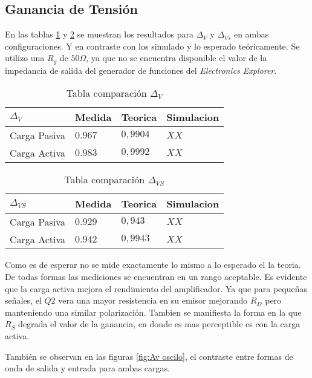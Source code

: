 \subsection{Ganancia de Tensión}

En las tablas \ref{table:comp av} y \ref{table:comp avs} se muestran los resultados para $\Delta_V$ y $\Delta_{Vs}$ en ambas configuraciones. Y en contraste con los simulado y lo esperado teóricamente.
Se utilizo una $R_g$ de $50\Omega$, ya que no se encuentra disponible el valor de la impedancia de salida del generador de funciones del \textit{Electronics Explorer}.

\begin{table}[ht]
    \centering
    \begin{tabular}{|l|l|l|l|}
    \hline
    $\Delta_V $  & Medida   & Teorica  & Simulacion \\ \hline
    Carga Pasiva & $0.967$  & $0,9904$ &  $XX$       \\ \hline
    Carga Activa & $0.983$  & $0,9992$ &  $XX$          \\ \hline
    \end{tabular}
    \caption{Tabla comparación $\Delta_V$}\label{table:comp av}
\end{table}

\begin{table}[ht]
    \centering
    \begin{tabular}{|l|l|l|l|}
    \hline
    $\Delta_{VS} $  & Medida   & Teorica  & Simulacion \\ \hline
    Carga Pasiva & $0.929$  & $0,943$ &  $XX$       \\ \hline
    Carga Activa & $0.942$  & $0,9943$ &  $XX$          \\ \hline
    \end{tabular}
    \caption{Tabla comparación $\Delta_{VS}$}\label{table:comp avs}
\end{table}

Como es de esperar no se mide exactamente lo mismo a lo esperado el la teoria. De todas formas las mediciones se encuentran en un rango aceptable. 
Es evidente que la carga activa mejora el rendimiento del amplificador. Ya que para pequeñas señales, el $Q2$ vera una mayor resistencia en su emisor mejorando $R_D$ pero manteniendo una similar polarización. 
Tambien se manifiesta la forma en la que $R_S$ degrada el valor de la ganancia, en donde es mas perceptible es con la carga activa.

También se observan en las figuras \ref{fig:Av oscilo}, el contraste entre formas de onda de salida y entrada para ambas cargas.



